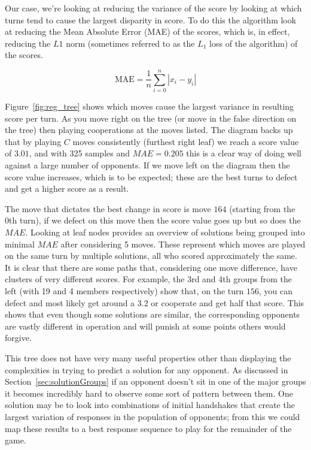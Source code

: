 Our case, we're looking at reducing the variance of the score by looking at which turns tend to cause the largest disparity in score.
To do this the algorithm look at reducing the Mean Absolute Error (MAE) of the scores, which is, in effect, reducing the $L1$ norm (sometimes referred to as the $L_1$ loss of the algorithm) of the scores.

$$\text{MAE} = \frac{1}{n}\sum_{i=0}^n |x_i-y_i|$$

Figure~\ref{fig:reg_tree} shows which moves cause the largest variance in resulting score per turn.
As you move right on the tree (or move in the false direction on the tree) then playing cooperations at the moves listed. 
The diagram backs up that by playing $C$ moves consistently (furthest right leaf) we reach a score value of $3.01$, and with 325 samples and $MAE=0.205$ this is a clear way of doing well against a large number of opponents.
If we move left on the diagram then the score value increases, which is to be expected; these are the best turns to defect and get a higher score as a result.

The move that dictates the best change in score is move $164$ (starting from the 0th turn), if we defect on this move then the score value goes up but so does the $MAE$.
Looking at leaf nodes provides an overview of solutions being grouped into minimal $MAE$ after considering 5 moves.
These represent which moves are played on the same turn by multiple solutions, all who scored approximately the same.
It is clear that there are some paths that, considering one move difference, have clusters of very different scores. 
For example, the 3rd and 4th groups from the left (with 19 and 4 members respectively) show that, on the turn $156$, you can defect and most likely get around a $3.2$ or cooperate and get half that score.
This shows that even though some solutions are similar, the corresponding opponents are vastly different in operation and will punish at some points others would forgive.

This tree does not have very many useful properties other than displaying the complexities in trying to predict a solution for any opponent.
As discussed in Section~\ref{sec:solutionGroups} if an opponent doesn't sit in one of the major groups it becomes incredibly hard to observe some sort of pattern between them.
One solution may be to look into combinations of initial handshakes that create the largest variation of responses in the population of opponents; from this we could map these results to a best response sequence to play for the remainder of the game.

